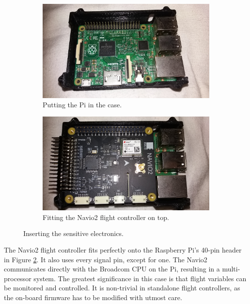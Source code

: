 \begin{figure}[H]
\begin{subfigure}{0.5\textwidth}
\centering
\includegraphics[scale=0.1]{images/drone-build-3dcase-pi.jpg}
\caption{Putting the Pi in the case.}
\label{fig:insertion_pi}
\end{subfigure}
\begin{subfigure}{0.5\textwidth}
\centering
\includegraphics[scale=0.1]{images/drone-build-3dcase-pi-navio.jpg}
\caption{Fitting the Navio2 flight controller on top.}
\label{fig:insertion_navio}
\end{subfigure}
\caption{Inserting the sensitive electronics.}
\label{fig:insertion}
\end{figure}

The Navio2 flight controller fits perfectly onto the Raspberry Pi's 40-pin header in Figure \ref{fig:insertion_navio}. It also uses every signal pin, except for one. The Navio2 communicates directly with the Broadcom CPU on the Pi, resulting in a multi-processor system. The greatest significance in this case is that flight variables can be monitored and controlled. It is non-trivial in standalone flight controllers, as the on-board firmware has to be modified with utmost care.

